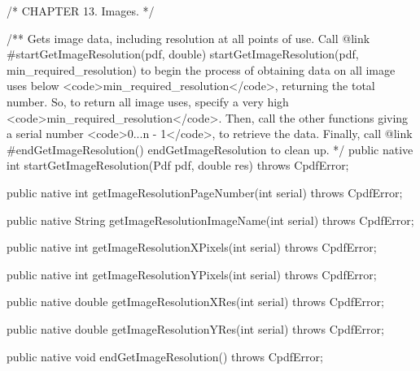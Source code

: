 /* CHAPTER 13. Images. */

/** Gets image data, including resolution at all points of use. Call
{@link #startGetImageResolution(pdf, double) startGetImageResolution(pdf,
min_required_resolution)} to begin the process of obtaining data on all
image uses below <code>min_required_resolution</code>, returning the total
number. So, to return all image uses, specify a very high
<code>min_required_resolution</code>. Then, call the other functions giving
a serial number <code>0...n - 1</code>, to retrieve the data. Finally, call
{@link #endGetImageResolution() endGetImageResolution} to clean up. */
public native int startGetImageResolution(Pdf pdf, double res)
    throws CpdfError;

public native int getImageResolutionPageNumber(int serial)
    throws CpdfError;

public native String getImageResolutionImageName(int serial)
    throws CpdfError;

public native int getImageResolutionXPixels(int serial) throws CpdfError;

public native int getImageResolutionYPixels(int serial) throws CpdfError;

public native double getImageResolutionXRes(int serial) throws CpdfError;

public native double getImageResolutionYRes(int serial) throws CpdfError;

public native void endGetImageResolution() throws CpdfError;
